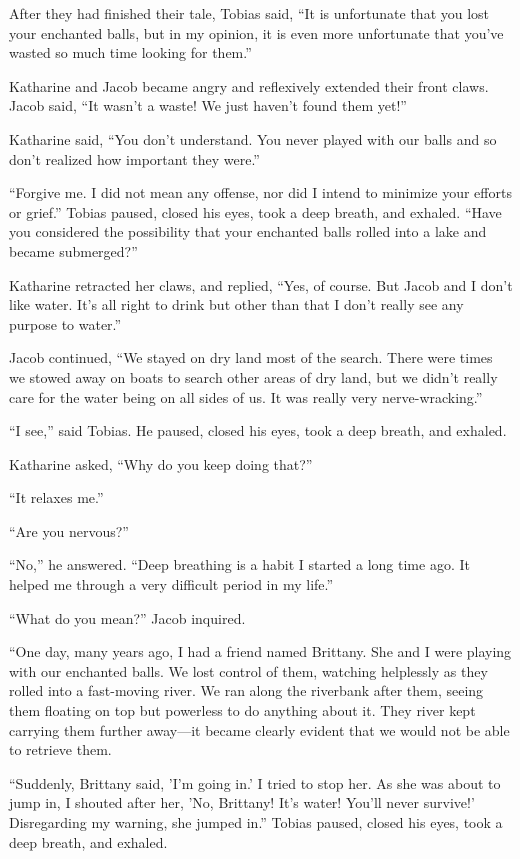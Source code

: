 After they had finished their tale, Tobias said, “It is unfortunate that you lost your enchanted balls, but in my opinion, it is even more unfortunate that you've wasted so much time looking for them.”

Katharine and Jacob became angry and reflexively extended their front claws. Jacob said, “It wasn't a waste! We just haven't found them yet!”

Katharine said, “You don't understand. You never played with our balls and so don't realized how important they were.”

“Forgive me. I did not mean any offense, nor did I intend to minimize your efforts or grief.” Tobias paused, closed his eyes, took a deep breath, and exhaled. “Have you considered the possibility that your enchanted balls rolled into a lake and became submerged?”

Katharine retracted her claws, and replied, “Yes, of course. But Jacob and I don't like water. It's all right to drink but other than that I don't really see any purpose to water.”

Jacob continued, “We stayed on dry land most of the search. There were times we stowed away on boats to search other areas of dry land, but we didn't really care for the water being on all sides of us. It was really very nerve-wracking.”

“I see,” said Tobias. He paused, closed his eyes, took a deep breath, and exhaled.

Katharine asked, “Why do you keep doing that?”

“It relaxes me.”

“Are you nervous?”

“No,” he answered. “Deep breathing is a habit I started a long time ago. It helped me through a very difficult period in my life.”

“What do you mean?” Jacob inquired.

“One day, many years ago, I had a friend named Brittany. She and I were playing with our enchanted balls. We lost control of them, watching helplessly as they rolled into a fast-moving river. We ran along the riverbank after them, seeing them floating on top but powerless to do anything about it. They river kept carrying them further away—it became clearly evident that we would not be able to retrieve them.

“Suddenly, Brittany said, 'I'm going in.' I tried to stop her. As she was about to jump in, I shouted after her, 'No, Brittany! It's water! You'll never survive!' Disregarding my warning, she jumped in.” Tobias paused, closed his eyes, took a deep breath, and exhaled.

